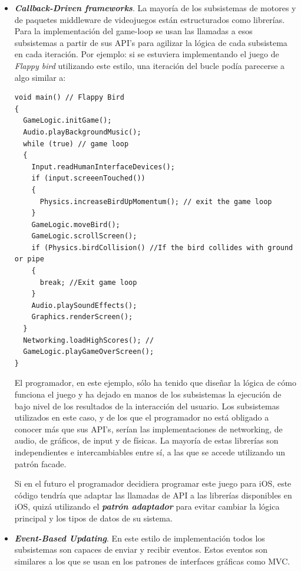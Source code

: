\documentclass[a4paper,12pt]{report}
\begin{document}
	\begin{itemize}
		\item \textbf{\textit{Callback-Driven frameworks}}. La mayoría de los subsistemas de motores y de paquetes middleware de videojuegos están estructurados como librerías. Para la implementación del game-loop se usan las llamadas a esos subsistemas a partir de sus API's para agilizar la lógica de cada subsistema en cada iteración. Por ejemplo: si se estuviera implementando el juego de \textit{Flappy bird} utilizando este estilo, una iteración del bucle podía parecerse a algo similar a:
		
		\begin{lstlisting}[style=C, numbers=none]
void main() // Flappy Bird
{
  GameLogic.initGame();
  Audio.playBackgroundMusic();
  while (true) // game loop
  {
    Input.readHumanInterfaceDevices();
    if (input.screeenTouched())
    {
      Physics.increaseBirdUpMomentum(); // exit the game loop
    }
    GameLogic.moveBird();
    GameLogic.scrollScreen();
    if (Physics.birdCollision() //If the bird collides with ground or pipe
    {
      break; //Exit game loop
    }
    Audio.playSoundEffects();
    Graphics.renderScreen();
  }
  Networking.loadHighScores(); //
  GameLogic.playGameOverScreen();
}
		\end{lstlisting}
		
		
		El programador, en este ejemplo, sólo ha tenido que diseñar la lógica de cómo funciona el juego y ha dejado en manos de los subsistemas la ejecución de bajo nivel de los resultados de la interacción del usuario. Los subsistemas utilizados en este caso, y de los que el programador no está obligado a conocer más que sus API's, serían las implementaciones de networking, de audio, de gráficos, de input y de físicas. La mayoría de estas librerías son independientes e intercambiables entre sí, a las que se accede utilizando un patrón facade.
		
		Si en el futuro el programador decidiera programar este juego para iOS, este código tendría que adaptar las llamadas de API a las librerías disponibles en iOS, quizá utilizando el \textit{\textbf{patrón adaptador}} para evitar cambiar la lógica principal y los tipos de datos de su sistema.\\
		
		\item \textit{\textbf{Event-Based Updating}}. En este estilo de implementación todos los subsistemas son capaces de enviar y recibir eventos. Estos eventos son similares a los que se usan en los patrones de interfaces gráficas como MVC. 
		

\end{itemize}
\end{document}

